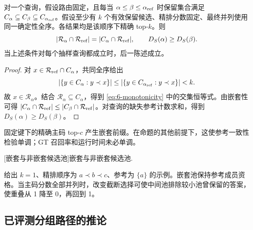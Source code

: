 \par\noindent\begin{minipage}{\linewidth}
\begin{proposition}[嵌套保留集合保持参考成员资格]
\label{prop:6-monotonicity}
对一个查询，假设路由固定，且每当 $\alpha\leq\beta\leq\alpha_{\rm ref}$ 时保留集合满足 $C_\alpha\subseteq C_\beta\subseteq C_{\alpha_{\rm ref}}$。假设至少有 $k$ 个有效保留候选、精排分数固定、最终并列使用同一确定性全序。各结果均是该顺序下精确 top-$k$。则
\begin{equation}
 |\mathcal R_\alpha\cap\mathcal R_{\rm ref}|
 =|C_\alpha\cap\mathcal R_{\rm ref}|,
 \qquad D_S(\alpha)\geq D_S(\beta).
 \label{eq:6-monotonicity}
\end{equation}
当上述条件对每个抽样查询都成立时，后一陈述成立。
\end{proposition}
\begin{proof}
对 $x\in\mathcal R_{\rm ref}\cap C_\alpha$，共同全序给出
\begin{equation*}
 |\{y\in C_\alpha:y\prec x\}|
 \leq|\{y\in C_{\alpha_{\rm ref}}:y\prec x\}|<k.
\end{equation*}
故 $x\in\mathcal R_\alpha$。结合 $\mathcal R_\alpha\subseteq C_\alpha$，得到 \cref{eq:6-monotonicity} 中的交集恒等式。由嵌套性可得 $|C_\alpha\cap\mathcal R_{\rm ref}|
 \leq|C_\beta\cap\mathcal R_{\rm ref}|$。对查询的缺失参考计数求和，得到 $D_S(\alpha)\geq D_S(\beta)$。
\end{proof}
\end{minipage}\par\medskip
固定键下的精确主码 top-$c$ 产生嵌套前缀。在命题的其他前提下，这使参考一致性检验单调；GT 召回率和运行时间未必单调。

\par\medskip\noindent\begin{minipage}{\linewidth}
\captionsetup{hypcap=false}
\centering
{}[嵌套与非嵌套候选池]{嵌套与非嵌套候选池.}
\label{tab:6-nesting}

\end{minipage}\par\medskip
{} 给出 $k=1$、精排顺序为 $a\prec b\prec c$、参考为 $\{a\}$ 的示例。嵌套池保持参考成员资格。当主码分数全部并列时，改变截断选择可使中间池排除较小池曾保留的答案，使重叠从 1 降至 0，再回到 1。

\subsection{已评测分组路径的推论}

